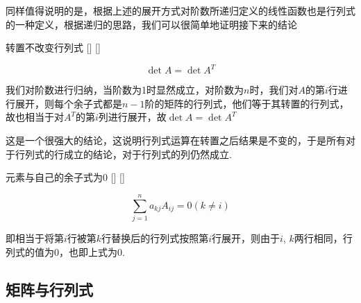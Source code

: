 \documentclass[UTF8]{ctexart}
\begin{document}
        同样值得说明的是，根据上述的展开方式对阶数所递归定义的线性函数也是行列式的一种定义，根据递归的思路，我们可以很简单地证明接下来的结论
    \begin{thm}
			[]
			{转置不改变行列式}
			[]
			[]

        \[\det A=\det A^{T}\]
    \end{thm}
    \begin{prf}
        我们对阶数进行归纳，当阶数为1时显然成立，对阶数为$n$时，我们对$A$的第$i$行进行展开，则每个余子式都是$n-1$阶的矩阵的行列式，他们等于其转置的行列式，故也相当于对$A^{T}$的第$i$列进行展开，故$\det A=\det A^{T}$
    \end{prf}
    这是一个很强大的结论，这说明行列式运算在转置之后结果是不变的，于是所有对于行列式的行成立的结论，对于行列式的列仍然成立.
    \begin{thm}
			[]
			{元素与自己的余子式 为0}
			[]
			[]

        \[\sum_{j=1}^na_{kj}A_{ij}=0(k\neq i)\]
    \end{thm}
    \begin{prf}
        即相当于将第$i$行被第$k$行替换后的行列式按照第$i$行展开，则由于$i$, $k$两行相同，行列式的值为0，也即上式为0.
    \end{prf}

    \subsection{矩阵与行列式}
\end{document}
